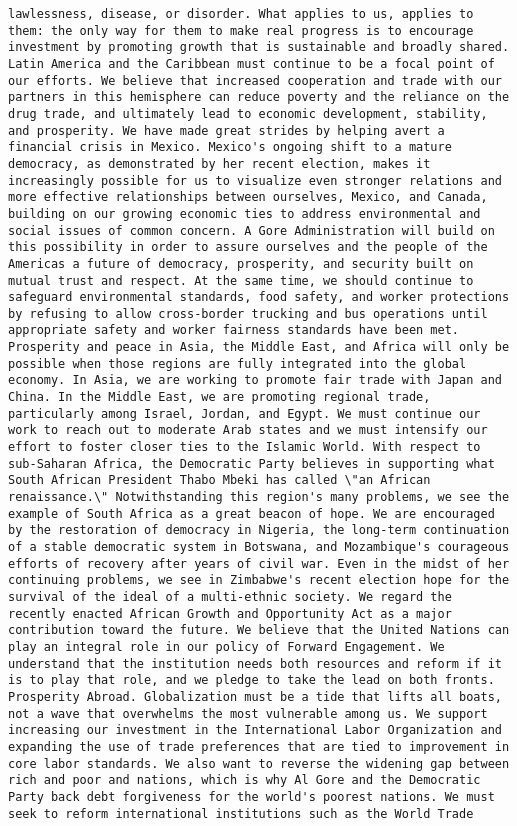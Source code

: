 \documentclass[
]{article}
\begin{document}
\begin{verbatim}
lawlessness, disease, or disorder. What applies to us, applies to them: the only way for them to make real progress is to encourage investment by promoting growth that is sustainable and broadly shared. Latin America and the Caribbean must continue to be a focal point of our efforts. We believe that increased cooperation and trade with our partners in this hemisphere can reduce poverty and the reliance on the drug trade, and ultimately lead to economic development, stability, and prosperity. We have made great strides by helping avert a financial crisis in Mexico. Mexico's ongoing shift to a mature democracy, as demonstrated by her recent election, makes it increasingly possible for us to visualize even stronger relations and more effective relationships between ourselves, Mexico, and Canada, building on our growing economic ties to address environmental and social issues of common concern. A Gore Administration will build on this possibility in order to assure ourselves and the people of the Americas a future of democracy, prosperity, and security built on mutual trust and respect. At the same time, we should continue to safeguard environmental standards, food safety, and worker protections by refusing to allow cross-border trucking and bus operations until appropriate safety and worker fairness standards have been met. Prosperity and peace in Asia, the Middle East, and Africa will only be possible when those regions are fully integrated into the global economy. In Asia, we are working to promote fair trade with Japan and China. In the Middle East, we are promoting regional trade, particularly among Israel, Jordan, and Egypt. We must continue our work to reach out to moderate Arab states and we must intensify our effort to foster closer ties to the Islamic World. With respect to sub-Saharan Africa, the Democratic Party believes in supporting what South African President Thabo Mbeki has called \"an African renaissance.\" Notwithstanding this region's many problems, we see the example of South Africa as a great beacon of hope. We are encouraged by the restoration of democracy in Nigeria, the long-term continuation of a stable democratic system in Botswana, and Mozambique's courageous efforts of recovery after years of civil war. Even in the midst of her continuing problems, we see in Zimbabwe's recent election hope for the survival of the ideal of a multi-ethnic society. We regard the recently enacted African Growth and Opportunity Act as a major contribution toward the future. We believe that the United Nations can play an integral role in our policy of Forward Engagement. We understand that the institution needs both resources and reform if it is to play that role, and we pledge to take the lead on both fronts. Prosperity Abroad. Globalization must be a tide that lifts all boats, not a wave that overwhelms the most vulnerable among us. We support increasing our investment in the International Labor Organization and expanding the use of trade preferences that are tied to improvement in core labor standards. We also want to reverse the widening gap between rich and poor and nations, which is why Al Gore and the Democratic Party back debt forgiveness for the world's poorest nations. We must seek to reform international institutions such as the World Trade 
\end{verbatim}
\end{document}
